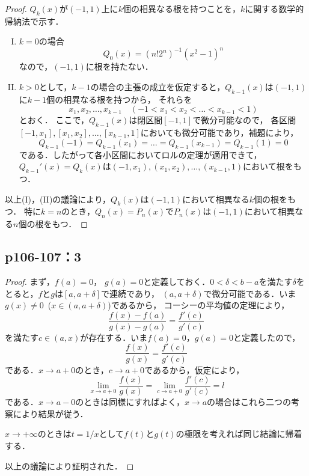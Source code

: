 \documentclass[uplatex,dvipdfmx,a4paper,10pt,fleqn]{jsarticle}
\begin{document}
\begin{leftbar}
    \begin{proof}
        $Q_k (x)$が$(-1,1)$上に$k$個の相異なる根を持つことを，$k$に関する数学的帰納法で示す．
        \begin{enumerate}[(I)]
        \item $k=0$の場合
        \[
            Q_0(x)= (n! 2^n)^{-1} (x^2-1)^n
        \]
        なので，$(-1,1)$に根を持たない．
        \item $k>0$として，$k-1$の場合の主張の成立を仮定すると，$Q_{k-1}(x)$は$(-1,1)$に$k-1$個の相異なる根を持つから，
        それらを
        \[
        x_1,x_2,\dots,x_{k-1}\quad (-1<x_1<x_2<\dots <x_{k-1}<1)
        \]とおく．
        ここで，$Q_{k-1} (x)$は閉区間$[-1,1]$で微分可能なので，
        各区間$[-1,x_1],[x_1,x_2],\dots,[x_{k-1},1]$においても微分可能であり，補題により，
        \[
            Q_{k-1} (-1) = Q_{k-1}(x_1)=\dots = Q_{k-1}(x_{k-1})=Q_{k-1}(1)=0
        \]
        である．したがって各小区間においてロルの定理が適用できて，$Q_{k-1}' (x)=Q_k(x)$は$(-1,x_1),(x_1,x_2),\dots,(x_{k-1},1)$において根をもつ．
        \end{enumerate}
        以上(I)，(II)の議論により，$Q_k (x)$は$(-1,1)$において相異なる$k$個の根をもつ．
        特に$k=n$のとき，$Q_n (x)=P_n(x)$で$P_n (x)$は$(-1,1)$において相異なる$n$個の根をもつ．
    \end{proof}
\end{leftbar}

\newpage 

\subsection*{p106-107：3}

\begin{tleftbar}
  \begin{proof}
  まず，$f(a)=0$， $g(a)=0$と定義しておく．$0<\delta <b-a$を満たす$\delta$をとると，$f$と$g$は$[a,a+\delta]$で連続であり，
  $(a,a+\delta)$で微分可能である．いま$g(x) \ne 0$~($ x \in (a,a+\delta)$)であるから，
  コーシーの平均値の定理により，
  \[
    \frac{f(x)-f(a)}{g(x)-g(a)} = \frac{f'(c)}{g'(c)}
  \]
  を満たす$c \in (a,x)$が存在する．いま$f(a)=0$，$g(a)=0$と定義したので，
  \[
    \frac{f(x)}{g(x)} = \frac{f'(c)}{g'(c)}
  \]
  である．$ x \to a+0$のとき，$c \to a+0$であるから，仮定により，
  \[
    \lim_{x \to a+0} \frac{f(x)}{g(x)} = \lim_{c \to a+0} \frac{f'(c)}{g'(c)} =l 
  \]
  である．$ x \to a-0$のときは同様にすればよく，$ x \to a$の場合はこれら二つの考察により結果が従う．

  $ x \to +\infty$のときは$ t=1/x$として$f(t)$と$g(t)$の極限を考えれば同じ結論に帰着する．

  以上の議論により証明された．
  \end{proof}
\end{tleftbar}
\end{document}

